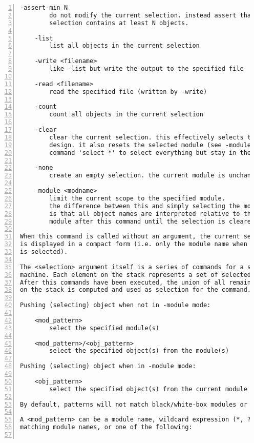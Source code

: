 \begin{lstlisting}[numbers=left,frame=single]
    -assert-min N
        do not modify the current selection. instead assert that the given
        selection contains at least N objects.

    -list
        list all objects in the current selection

    -write <filename>
        like -list but write the output to the specified file

    -read <filename>
        read the specified file (written by -write)

    -count
        count all objects in the current selection

    -clear
        clear the current selection. this effectively selects the whole
        design. it also resets the selected module (see -module). use the
        command 'select *' to select everything but stay in the current module.

    -none
        create an empty selection. the current module is unchanged.

    -module <modname>
        limit the current scope to the specified module.
        the difference between this and simply selecting the module
        is that all object names are interpreted relative to this
        module after this command until the selection is cleared again.

When this command is called without an argument, the current selection
is displayed in a compact form (i.e. only the module name when a whole module
is selected).

The <selection> argument itself is a series of commands for a simple stack
machine. Each element on the stack represents a set of selected objects.
After this commands have been executed, the union of all remaining sets
on the stack is computed and used as selection for the command.

Pushing (selecting) object when not in -module mode:

    <mod_pattern>
        select the specified module(s)

    <mod_pattern>/<obj_pattern>
        select the specified object(s) from the module(s)

Pushing (selecting) object when in -module mode:

    <obj_pattern>
        select the specified object(s) from the current module

By default, patterns will not match black/white-box modules or theircontents. To include such objects, prefix the pattern with '='.

A <mod_pattern> can be a module name, wildcard expression (*, ?, [..])
matching module names, or one of the following:


\end{lstlisting}
